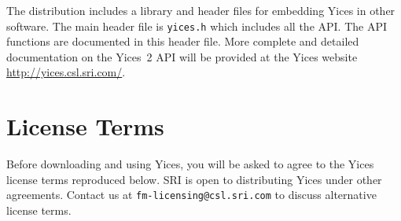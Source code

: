 \documentclass[11pt,twoside,fleqn,openright,titlepage]{cslreport}
\begin{document}
The distribution includes a library and header files for embedding
Yices in other software. The main header file is \texttt{yices.h}
which includes all the API. The API functions are documented in this
header file. More complete and detailed documentation on the Yices~2
API will be provided at the Yices website
\url{http://yices.csl.sri.com/}.


\chapter{License Terms}
\label{license}

Before downloading and using Yices, you will be asked to agree to the
Yices license terms reproduced below. SRI is open to distributing
Yices under other agreements. Contact us
at \texttt{fm-licensing@csl.sri.com} to discuss alternative license
terms.
\end{document}
